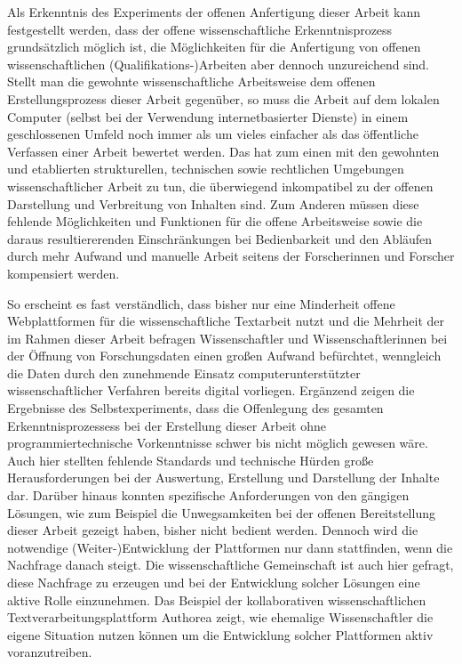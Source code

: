 Als Erkenntnis des Experiments der offenen Anfertigung dieser Arbeit kann festgestellt werden, dass der offene wissenschaftliche Erkenntnisprozess grundsätzlich möglich ist, die Möglichkeiten für die Anfertigung von offenen wissenschaftlichen (Qualifikations-)Arbeiten aber dennoch unzureichend sind. Stellt man die gewohnte wissenschaftliche Arbeitsweise dem offenen Erstellungsprozess dieser Arbeit gegenüber, so muss die Arbeit auf dem lokalen Computer (selbst bei der Verwendung internetbasierter Dienste) in einem geschlossenen Umfeld noch immer als um vieles einfacher als das öffentliche Verfassen einer Arbeit bewertet werden. Das hat zum einen mit den gewohnten und etablierten strukturellen, technischen sowie rechtlichen Umgebungen wissenschaftlicher Arbeit zu tun, die überwiegend inkompatibel zu der offenen Darstellung und Verbreitung von Inhalten sind. Zum Anderen müssen diese fehlende Möglichkeiten und Funktionen für die offene Arbeitsweise sowie die daraus resultiererenden Einschränkungen bei Bedienbarkeit und den Abläufen durch mehr Aufwand und manuelle Arbeit seitens der Forscherinnen und Forscher kompensiert werden.

So erscheint es fast verständlich, dass bisher nur eine Minderheit offene Webplattformen für die wissenschaftliche Textarbeit \cite{Perkel_2014} nutzt und die Mehrheit der im Rahmen dieser Arbeit befragen Wissenschaftler und Wissenschaftlerinnen bei der Öffnung von Forschungsdaten einen großen Aufwand befürchtet, wenngleich die Daten durch den zunehmende Einsatz computerunterstützter wissenschaftlicher Verfahren bereits digital vorliegen. Ergänzend zeigen die Ergebnisse des Selbstexperiments, dass die Offenlegung des gesamten Erkenntnisprozessess bei der Erstellung dieser Arbeit ohne programmiertechnische Vorkenntnisse schwer bis nicht möglich gewesen wäre. Auch hier stellten fehlende Standards und technische Hürden große Herausforderungen bei der Auswertung, Erstellung und Darstellung der Inhalte dar. Darüber hinaus konnten spezifische Anforderungen von den gängigen Lösungen, wie zum Beispiel die Un­weg­sam­keiten bei der offenen Bereitstellung dieser Arbeit gezeigt haben, bisher nicht bedient werden. Dennoch wird die notwendige (Weiter-)Entwicklung der Plattformen nur dann stattfinden, wenn die Nachfrage danach steigt. Die wissenschaftliche Gemeinschaft ist auch hier gefragt, diese Nachfrage zu erzeugen und bei der Entwicklung solcher Lösungen eine aktive Rolle einzunehmen. Das Beispiel der kollaborativen wissenschaftlichen Textverarbeitungsplattform Authorea zeigt, wie ehemalige Wissenschaftler die eigene Situation nutzen können um die Entwicklung solcher Plattformen aktiv voranzutreiben.

